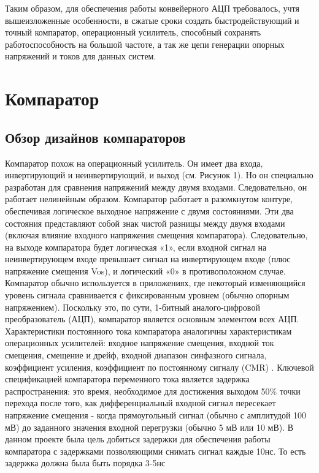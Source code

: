 \documentclass[a4paper,12pt]{article} %
\begin{document}
Таким образом, для обеспечения работы конвейерного АЦП требовалось, учтя вышеизложенные особенности, в сжатые сроки создать быстродействующий и точный компаратор, операционный усилитель, способный сохранять работоспособность на большой частоте, а так же цепи генерации опорных напряжений и токов для данных систем. 


\section{Компаратор}

\subsection{Обзор дизайнов компараторов}

Компаратор похож на операционный усилитель. Он имеет два входа, инвертирующий и неинвертирующий, и выход (см. Рисунок 1). Но он специально разработан для сравнения напряжений между двумя входами. Следовательно, он работает нелинейным образом. Компаратор работает в разомкнутом контуре, обеспечивая логическое выходное напряжение с двумя состояниями. Эти два состояния представляют собой знак чистой разницы между двумя входами (включая влияние входного напряжения смещения компаратора). Следовательно, на выходе компаратора будет логическая «1», если входной сигнал на неинвертирующем входе превышает сигнал на инвертирующем входе (плюс напряжение смещения Vos), и логический «0» в противоположном случае. Компаратор обычно используется в приложениях, где некоторый изменяющийся уровень сигнала сравнивается с фиксированным уровнем (обычно опорным напряжением). Поскольку это, по сути, 1-битный аналого-цифровой преобразователь (АЦП), компаратор является основным элементом всех АЦП. 
Характеристики постоянного тока компаратора аналогичны характеристикам операционных усилителей: входное напряжение смещения, входной ток смещения, смещение и дрейф, входной диапазон синфазного сигнала, коэффициент усиления, коэффициент по постоянному сигналу (CMR) . Ключевой спецификацией компаратора переменного тока является задержка распространения: это время, необходимое для достижения выходом 50\% точки перехода после того, как дифференциальный входной сигнал пересекает напряжение смещения - когда прямоугольный сигнал (обычно с амплитудой 100 мВ) до заданного значения входной перегрузки (обычно 5 мВ или 10 мВ).  В данном проекте была цель добиться задержки для обеспечения работы компаратора с задержками позволяющими снимать сигнал каждые 10нс. То есть задержка должна была быть порядка 3-5нс
\end{document}
